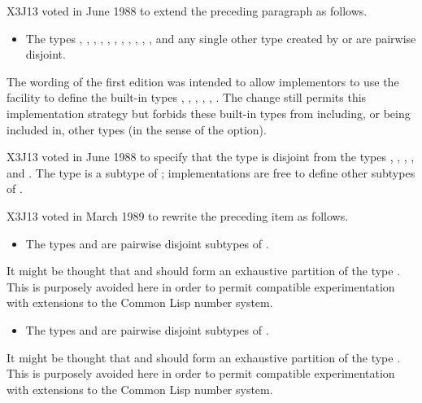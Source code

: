 \begin{new}
X3J13 voted in June 1988
to extend the preceding paragraph as follows.

\begin{itemize}
\item
The types , , , , ,
, , , ,
, , and any single other type created by
 or 
are pairwise disjoint.
\end{itemize}

The wording of the first edition was intended to allow implementors to use
the  facility to define the built-in types ,
, , , , .
The change still permits this implementation strategy but
forbids these built-in types from including, or being included in,
other types (in the sense of the   option).
\end{new}

\begin{new}
X3J13 voted in June 1988 
to specify that the type 
is disjoint from the types , , , , and .
The type  is a subtype of ;
implementations are free to define other subtypes of .
\end{new}

\begin{newer}
X3J13 voted in March 1989  to rewrite the preceding item
as follows.
\begin{itemize}
\item
The types  and  are pairwise disjoint
subtypes of .
\end{itemize}

\beforenoterule
\begin{rationale}
It might be thought that  and  should
form an exhaustive partition of the type .  This is purposely
avoided here in order to permit compatible experimentation with extensions
to the Common Lisp number system.
\end{rationale}
\afternoterule

\begin{itemize}
\item
The types  and  are pairwise disjoint
subtypes of .
\end{itemize}

\beforenoterule
\begin{rationale}
It might be thought that  and  should
form an exhaustive partition of the type .  This is purposely
avoided here in order to permit compatible experimentation with extensions
to the Common Lisp number system.
\end{rationale}
\afternoterule
\end{newer}


